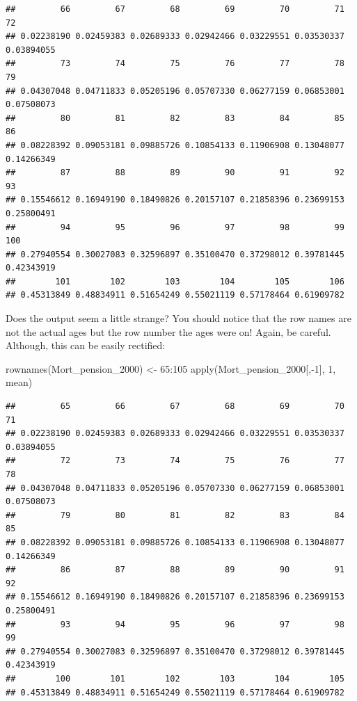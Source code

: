\documentclass[
]{book}
\newenvironment{Shaded}{\begin{snugshade}}{\end{snugshade}}
\newcommand{\DecValTok}[1]{\textcolor[rgb]{0.00,0.00,0.81}{#1}}
\newcommand{\FunctionTok}[1]{\textcolor[rgb]{0.00,0.00,0.00}{#1}}
\newcommand{\NormalTok}[1]{#1}
\newcommand{\OtherTok}[1]{\textcolor[rgb]{0.56,0.35,0.01}{#1}}
\newcommand{\SpecialCharTok}[1]{\textcolor[rgb]{0.00,0.00,0.00}{#1}}
\theoremstyle{definition}
\theoremstyle{definition}
\theoremstyle{definition}
\theoremstyle{definition}
\theoremstyle{remark}
\begin{document}
\begin{verbatim}
##         66         67         68         69         70         71         72 
## 0.02238190 0.02459383 0.02689333 0.02942466 0.03229551 0.03530337 0.03894055 
##         73         74         75         76         77         78         79 
## 0.04307048 0.04711833 0.05205196 0.05707330 0.06277159 0.06853001 0.07508073 
##         80         81         82         83         84         85         86 
## 0.08228392 0.09053181 0.09885726 0.10854133 0.11906908 0.13048077 0.14266349 
##         87         88         89         90         91         92         93 
## 0.15546612 0.16949190 0.18490826 0.20157107 0.21858396 0.23699153 0.25800491 
##         94         95         96         97         98         99        100 
## 0.27940554 0.30027083 0.32596897 0.35100470 0.37298012 0.39781445 0.42343919 
##        101        102        103        104        105        106 
## 0.45313849 0.48834911 0.51654249 0.55021119 0.57178464 0.61909782
\end{verbatim}

Does the output seem a little strange? You should notice that the row names are not the actual ages but the row number the ages were on! Again, be careful. Although, this can be easily rectified:

\begin{Shaded}
\begin{Highlighting}[]
\FunctionTok{rownames}\NormalTok{(Mort\_pension\_2000) }\OtherTok{\textless{}{-}} \DecValTok{65}\SpecialCharTok{:}\DecValTok{105}
\FunctionTok{apply}\NormalTok{(Mort\_pension\_2000[,}\SpecialCharTok{{-}}\DecValTok{1}\NormalTok{], }\DecValTok{1}\NormalTok{, mean)}
\end{Highlighting}
\end{Shaded}

\begin{verbatim}
##         65         66         67         68         69         70         71 
## 0.02238190 0.02459383 0.02689333 0.02942466 0.03229551 0.03530337 0.03894055 
##         72         73         74         75         76         77         78 
## 0.04307048 0.04711833 0.05205196 0.05707330 0.06277159 0.06853001 0.07508073 
##         79         80         81         82         83         84         85 
## 0.08228392 0.09053181 0.09885726 0.10854133 0.11906908 0.13048077 0.14266349 
##         86         87         88         89         90         91         92 
## 0.15546612 0.16949190 0.18490826 0.20157107 0.21858396 0.23699153 0.25800491 
##         93         94         95         96         97         98         99 
## 0.27940554 0.30027083 0.32596897 0.35100470 0.37298012 0.39781445 0.42343919 
##        100        101        102        103        104        105 
## 0.45313849 0.48834911 0.51654249 0.55021119 0.57178464 0.61909782
\end{verbatim}
\end{document}

